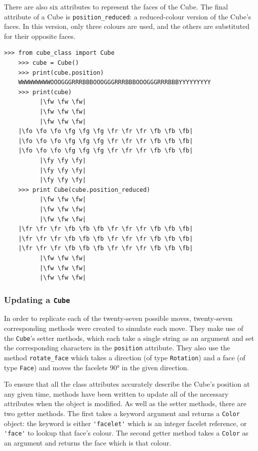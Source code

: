 \documentclass{report}
\newcommand{\fw}{\color{gray}W }
\newcommand{\fo}{\color{orange}O }
\newcommand{\fg}{\color{green}G }
\newcommand{\fr}{\color{red}R }
\newcommand{\fb}{\color{blue}B }
\newcommand{\fy}{\color{yellow}Y }
\begin{document}
    There are also six attributes to represent the faces of the Cube. The final attribute of a Cube is \lstinline|position_reduced|: a reduced-colour version of the Cube's faces. In this version, only three colours are used, and the others are substituted for their opposite faces.
    
	\begin{lstlisting}[caption={The two different ways of accessing a Cube's position}, label={lst:cubePrint}]
    >>> from cube_class import Cube
    >>> cube = Cube()
    >>> print(cube.position)
    WWWWWWWWWOOOGGGRRRBBBOOOGGGRRRBBBOOOGGGRRRBBBYYYYYYYYY
    >>> print(cube)
          |\fw \fw \fw|
          |\fw \fw \fw|
          |\fw \fw \fw|
    |\fo \fo \fo \fg \fg \fg \fr \fr \fr \fb \fb \fb|
    |\fo \fo \fo \fg \fg \fg \fr \fr \fr \fb \fb \fb|
    |\fo \fo \fo \fg \fg \fg \fr \fr \fr \fb \fb \fb|
          |\fy \fy \fy|
          |\fy \fy \fy|
          |\fy \fy \fy|
	>>> print Cube(cube.position_reduced)
	      |\fw \fw \fw|
	      |\fw \fw \fw|
	      |\fw \fw \fw|
	|\fr \fr \fr \fb \fb \fb \fr \fr \fr \fb \fb \fb|
	|\fr \fr \fr \fb \fb \fb \fr \fr \fr \fb \fb \fb|
	|\fr \fr \fr \fb \fb \fb \fr \fr \fr \fb \fb \fb|
	      |\fw \fw \fw|
	      |\fw \fw \fw|
	      |\fw \fw \fw|\end{lstlisting}
    
    \subsubsection{Updating a \lstinline|Cube|}
    
    In order to replicate each of the twenty-seven possible moves, twenty-seven corresponding methods were created to simulate each move. They make use of the \lstinline|Cube|'s setter methods, which each take a single string as an argument and set the corresponding characters in the \lstinline|position| attribute. They also use the method \lstinline|rotate_face| which takes a direction (of type \lstinline|Rotation|) and a face (of type \lstinline|Face|) and moves the facelets \ang{90} in the given direction.
    
    To ensure that all the class attributes accurately describe the Cube's position at any given time, methods have been written to update all of the necessary attributes when the object is modified. As well as the setter methods, there are two getter methods. The first takes a keyword argument and returns a \lstinline|Color| object: the keyword is either \lstinline|'facelet'| which is an integer facelet reference, or \lstinline|'face'| to lookup that face's colour. The second getter method takes a \lstinline|Color| as an argument and returns the face which is that colour.
    
\end{document}
